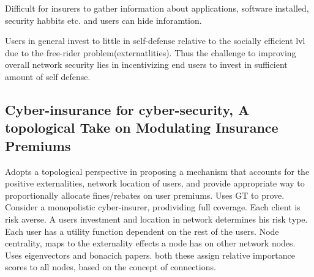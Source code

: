 Difficult for insurers to gather information about applications, software installed, security habbits
  etc. and users can hide inforamtion.
 
Users in general invest to little in self-defense relative to the socially efficient lvl due to the
 free-rider problem(externatlities).  Thus the challenge to improving overall network security lies in
  incentivizing end users to invest in sufficient amount of self defense.
\subsection{Cyber-insurance for cyber-security, A topological Take on Modulating Insurance Premiums}
Adopts a topological perspective in proposing a mechanism that accounts for the positive
 externalities, network location of users, and provide appropriate way to proportionally allocate
  fines/rebates on user premiums. Uses GT to prove. Consider a monopolistic cyber-insurer, prodividing
   full coverage. Each client is risk averse. A users investment and location in network determines
    his risk type. Each user has a utility function dependent on the rest of the users. 
    Node centrality, maps to the externality effects a node has on other network nodes. Uses
    eigenvectors and bonacich papers. both these assign relative importance scores to all nodes, based on the concept of connections.  



